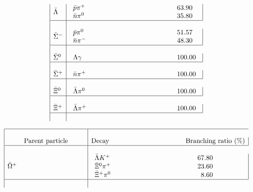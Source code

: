 \[\begin{array}{|l|l|}
\bar{\Lambda}  &
\begin{array}{lr}
\makebox[5cm][l]{$\bar{p}\pi^+$}         &  63.90    \\
\bar{n}\pi^0           &  35.80
\end{array} \\ \hline

\bar{\Sigma}^- &
\begin{array}{lr}
\makebox[5cm][l]{$\bar{p}\pi^0$}         &  51.57    \\
\bar{n}\pi^-           &  48.30
\end{array} \\ \hline

\bar{\Sigma}^0 &
\begin{array}{lr}
\makebox[5cm][l]{$\Lambda\gamma$}        &  100.00
\end{array} \\ \hline

\bar{\Sigma}^+ &
\begin{array}{lr}
\makebox[5cm][l]{$\bar{n}\pi^+$}         &  100.00
\end{array} \\ \hline

\bar{\Xi}^0    &
\begin{array}{lr}
\makebox[5cm][l]{$\bar{\Lambda}\pi^0$}   &  100.00
\end{array} \\ \hline

\bar{\Xi}^+    &
\begin{array}{lr}
\makebox[5cm][l]{$\bar{\Lambda}\pi^+$}   &  100.00
\end{array} \\ \hline

\end{array}
\]

\[
\begin{array}{|l|l|}
\hline
\makebox[4cm][|l]{Parent particle} &
\makebox[8cm][|c|]{Decay \hfill Branching ratio (\%)} \\ \hline

\bar{\Omega}^+ &
\begin{array}{lr}
\makebox[5cm][l]{$\bar{\Lambda}K^+$}     &  67.80    \\
\bar{\Xi}^0\pi^+       &  23.60    \\
\bar{\Xi}^+\pi^0       &  8.60
\end{array} \\ \hline

\end{array}
\]
